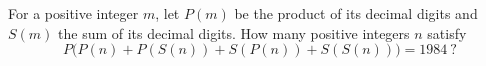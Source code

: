 For a positive integer $m$, let $P(m)$ be the product of its decimal digits and $S(m)$ the sum of its decimal digits. How many positive integers $n$ satisfy
\[
P\bigl(P(n)+P(S(n))+S(P(n))+S(S(n))\bigr)=1984\ ?
\]
